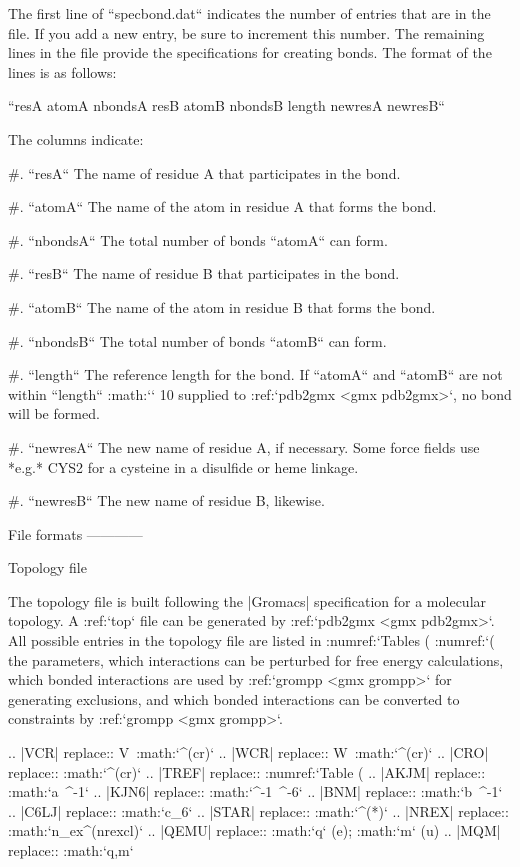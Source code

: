 The first line of ``specbond.dat`` indicates the number of
entries that are in the file. If you add a new entry, be sure to
increment this number. The remaining lines in the file provide the
specifications for creating bonds. The format of the lines is as
follows:

``resA atomA nbondsA resB atomB nbondsB length newresA
newresB``

The columns indicate:

#. ``resA`` The name of residue A that participates in the
   bond.

#. ``atomA`` The name of the atom in residue A that forms
   the bond.

#. ``nbondsA`` The total number of bonds
   ``atomA`` can form.

#. ``resB`` The name of residue B that participates in the
   bond.

#. ``atomB`` The name of the atom in residue B that forms
   the bond.

#. ``nbondsB`` The total number of bonds
   ``atomB`` can form.

#. ``length`` The reference length for the bond. If
   ``atomA`` and ``atomB`` are not within
   ``length`` :math:`\pm` 10%
   supplied to :ref:`pdb2gmx <gmx pdb2gmx>`, no bond will be formed.

#. ``newresA`` The new name of residue A, if necessary. Some
   force fields use *e.g.* CYS2 for a cysteine in a disulfide or heme
   linkage.

#. ``newresB`` The new name of residue B, likewise.

File formats
------------

Topology file
~~~~~~~~~~~~~

The topology file is built following the |Gromacs| specification for a
molecular topology. A :ref:`top` file can be generated by
:ref:`pdb2gmx <gmx pdb2gmx>`. All possible entries in the topology file are
listed in :numref:`Tables (%
:numref:`(%
the parameters, which interactions can be perturbed for free energy
calculations, which bonded interactions are used by
:ref:`grompp <gmx grompp>` for generating exclusions, and which bonded
interactions can be converted to constraints by :ref:`grompp <gmx grompp>`.

.. |VCR| replace:: V\ :math:`^{(cr)}`
.. |WCR| replace:: W\ :math:`^{(cr)}`
.. |CRO| replace:: :math:`^{(cr)}`
.. |TREF| replace:: :numref:`Table (%
.. |AKJM| replace:: :math:`a~^{-1}`
.. |KJN6| replace:: :math:`^{-1}~^{-6}`
.. |BNM| replace:: :math:`b~^{-1}`
.. |C6LJ| replace:: :math:`c_6`
.. |STAR| replace:: :math:`^{(*)}`
.. |NREX| replace:: :math:`n_{ex}^{(nrexcl)}`
.. |QEMU| replace:: :math:`q` (e); :math:`m` (u) 
.. |MQM| replace:: :math:`q,m`

